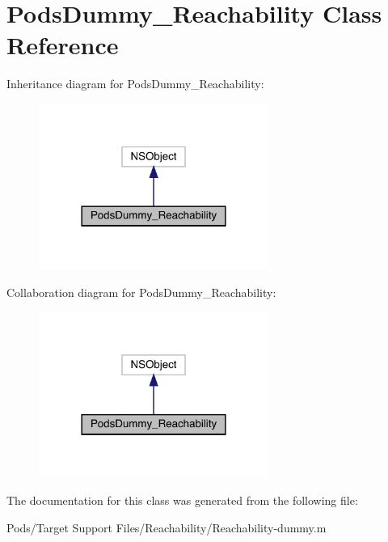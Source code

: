 \hypertarget{interface_pods_dummy___reachability}{}\section{Pods\+Dummy\+\_\+\+Reachability Class Reference}
\label{interface_pods_dummy___reachability}


Inheritance diagram for Pods\+Dummy\+\_\+\+Reachability\+:\nopagebreak
\begin{figure}[H]
\begin{center}
\leavevmode
\includegraphics[width=213pt]{interface_pods_dummy___reachability__inherit__graph}
\end{center}
\end{figure}


Collaboration diagram for Pods\+Dummy\+\_\+\+Reachability\+:\nopagebreak
\begin{figure}[H]
\begin{center}
\leavevmode
\includegraphics[width=213pt]{interface_pods_dummy___reachability__coll__graph}
\end{center}
\end{figure}


The documentation for this class was generated from the following file\+:\begin{DoxyCompactItemize}
\item 
Pods/\+Target Support Files/\+Reachability/Reachability-\/dummy.\+m\end{DoxyCompactItemize}
